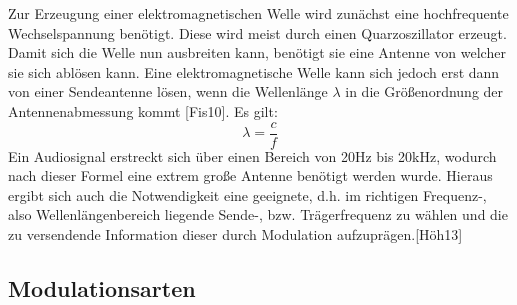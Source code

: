 Zur Erzeugung einer elektromagnetischen Welle wird zunächst eine hochfrequente Wechselspannung benötigt. Diese wird meist durch einen Quarzoszillator erzeugt. Damit sich
die Welle nun ausbreiten kann, benötigt sie eine Antenne von welcher sie sich ablösen kann.
Eine elektromagnetische Welle kann sich jedoch erst dann von einer Sendeantenne lösen,
wenn die Wellenlänge $\lambda$ in die Größenordnung der Antennenabmessung kommt [Fis10]. Es
gilt:
\begin{equation}
	\label{equ:bsp1}
	\lambda = \frac{c}{f} 
\end{equation}
Ein Audiosignal erstreckt sich über einen Bereich von 20Hz bis 20kHz, wodurch nach dieser Formel eine extrem große Antenne benötigt werden wurde. Hieraus ergibt sich auch die Notwendigkeit eine geeignete, d.h. im richtigen Frequenz-, also Wellenlängenbereich
liegende Sende-, bzw. Trägerfrequenz zu wählen und die zu versendende Information dieser
durch Modulation aufzuprägen.[Höh13]

\subsection{Modulationsarten}
\label{subsec:Unterabschnitt1}

